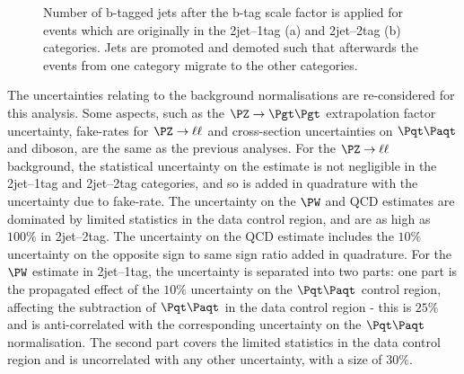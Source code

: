 \begin{figure}
\begin{center}

\end{center}
\caption[Number of b-tagged jets after the b-tag scale factor (SF) is applied for events which
are originally in the 2jet--1tag (a) and 2jet--2tag (b) categories.]{
Number of b-tagged jets after the b-tag scale factor is applied for events which
are originally in the 2jet--1tag (a) and 2jet--2tag (b) categories. Jets
are promoted and demoted such that afterwards the events from one category
migrate to the other categories.}
\label{fig:Hhhbtagsystematic}
\end{figure}

The uncertainties relating to the background normalisations are re-considered
for this analysis. Some aspects, such as the $\ZToTauTau$ extrapolation factor
uncertainty, fake-rates for $\PZ\to\ell\ell$ and cross-section uncertainties on
$\ttbar$ and diboson, are the same as the previous analyses. For the
$\PZ\to\ell\ell$ background, the statistical uncertainty on the estimate is not
negligible in the 2jet--1tag and 2jet--2tag categories, and so is added in
quadrature with the uncertainty due to fake-rate. The uncertainty on the
$\PW$ and QCD estimates are dominated by limited statistics in the data control
region, and are as high as $100\%$ in 2jet--2tag. The uncertainty on the QCD
estimate includes the $10\%$ uncertainty on the opposite sign to same sign ratio
added in quadrature. For the $\PW$ estimate in 2jet--1tag, the uncertainty is
separated into two parts: one part is the propagated effect of the $10\%$
uncertainty on the $\ttbar$ control region, affecting the subtraction of
$\ttbar$ in the data control region - this is $25\%$ and is anti-correlated with
the corresponding uncertainty on the $\ttbar$ normalisation. The second part
covers the limited statistics in the data control region and is uncorrelated
with any other uncertainty, with a size of $30\%$.


